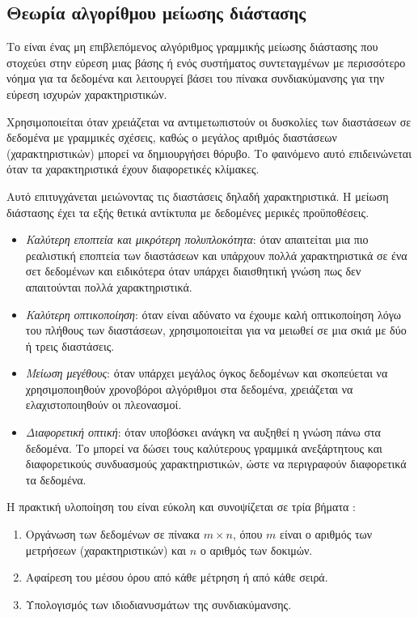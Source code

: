 \subsection{Θεωρία αλγορίθμου μείωσης διάστασης}
Το  είναι ένας μη επιβλεπόμενος αλγόριθμος γραμμικής μείωσης διάστασης που στοχεύει στην εύρεση μιας βάσης ή ενός συστήματος συντεταγμένων με περισσότερο νόημα για τα δεδομένα και λειτουργεί βάσει του πίνακα συνδιακύμανσης για την εύρεση ισχυρών χαρακτηριστικών.\par
Χρησιμοποιείται όταν χρειάζεται να αντιμετωπιστούν οι δυσκολίες των διαστάσεων σε δεδομένα με γραμμικές σχέσεις, καθώς ο μεγάλος αριθμός διαστάσεων (χαρακτηριστικών) μπορεί να δημιουργήσει θόρυβο. Το φαινόμενο αυτό επιδεινώνεται όταν τα χαρακτηριστικά έχουν διαφορετικές κλίμακες.\par
Αυτό επιτυγχάνεται μειώνοντας τις διαστάσεις δηλαδή χαρακτηριστικά. Η μείωση διάστασης έχει τα εξής θετικά αντίκτυπα με δεδομένες μερικές προϋποθέσεις.
\begin{itemize}
\item \emph{Καλύτερη εποπτεία και μικρότερη πολυπλοκότητα}: όταν απαιτείται μια πιο ρεαλιστική εποπτεία των διαστάσεων και υπάρχουν πολλά χαρακτηριστικά σε ένα σετ δεδομένων και ειδικότερα όταν υπάρχει διαισθητική γνώση πως δεν απαιτούνται πολλά χαρακτηριστικά.
\item \emph{Καλύτερη οπτικοποίηση}: όταν είναι αδύνατο να έχουμε καλή οπτικοποίηση λόγω του πλήθους των διαστάσεων, χρησιμοποιείται  για να μειωθεί σε μια σκιά με δύο ή τρεις διαστάσεις.
\item \emph{Μείωση μεγέθους}: όταν υπάρχει μεγάλος όγκος δεδομένων και σκοπεύεται να χρησιμοποιηθούν χρονοβόροι αλγόριθμοι στα δεδομένα, χρειάζεται να ελαχιστοποιηθούν οι πλεονασμοί.
\item \emph{Διαφορετική οπτική}: όταν υποβόσκει ανάγκη να αυξηθεί η γνώση πάνω στα δεδομένα. Το  μπορεί να δώσει τους καλύτερους γραμμικά ανεξάρτητους και διαφορετικούς συνδυασμούς χαρακτηριστικών, ώστε να περιγραφούν διαφορετικά τα δεδομένα.
\end{itemize}
Η πρακτική υλοποίηση του  είναι εύκολη και συνοψίζεται σε τρία βήματα \cite{PCA}:
\begin{enumerate}
\item Οργάνωση των δεδομένων σε πίνακα $m \times n$, όπου $m$ είναι ο αριθμός των μετρήσεων (χαρακτηριστικών) και $n$ ο αριθμός των δοκιμών.
\item Αφαίρεση του μέσου όρου από κάθε μέτρηση ή από κάθε σειρά.
\item Υπολογισμός  των ιδιοδιανυσμάτων της συνδιακύμανσης.
\end{enumerate}
